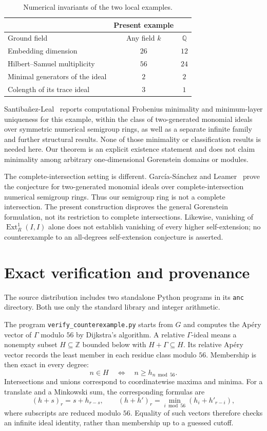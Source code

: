 \documentclass[11pt,letterpaper]{article}
\theoremstyle{remark}
\newcommand{\ZZ}{\mathbb Z}
\newcommand{\QQ}{\mathbb Q}
\newcommand{\Ext}{\operatorname{Ext}}
\numberwithin{equation}{section}
\begin{document}
\begin{table}[htbp]
\centering
\small
\begin{tabularx}{\textwidth}{@{}>{\raggedright\arraybackslash}Xcc@{}}
\toprule
 & Present example & \cite[Example~3.3]{CGI}\\
\midrule
Ground field & Any field $k$ & $\QQ$\\
Embedding dimension & $26$ & $12$\\
Hilbert--Samuel multiplicity & $56$ & $24$\\
Minimal generators of the ideal & $2$ & $2$\\
Colength of its trace ideal & $3$ & $1$\\
\bottomrule
\end{tabularx}
\caption{Numerical invariants of the two local examples.}\label{tab:comparison}
\end{table}


Santiba\~nez-Leal~\cite{FSL} reports computational Frobenius minimality and minimum-layer uniqueness for this example, within the class of two-generated monomial ideals over symmetric numerical semigroup rings, as well as a separate infinite family and further structural results. None of those minimality or classification results is needed here. Our theorem is an explicit existence statement and does not claim minimality among arbitrary one-dimensional Gorenstein domains or modules.

The complete-intersection setting is different. Garc\'ia-S\'anchez and Leamer~\cite{GL} prove the conjecture for two-generated monomial ideals over complete-intersection numerical semigroup rings. Thus our semigroup ring is not a complete intersection. The present construction disproves the general Gorenstein formulation, not its restriction to complete intersections. Likewise, vanishing of $\Ext_R^1(I,I)$ alone does not establish vanishing of every higher self-extension; no counterexample to an all-degrees self-extension conjecture is asserted.

\section{Exact verification and provenance}\label{sec:verification}
The source distribution includes two standalone Python programs in its \texttt{anc} directory. Both use only the standard library and integer arithmetic.

\pagebreak
The program \texttt{verify\_counterexample.py} starts from $G$ and computes the Ap\'ery vector of $\Gamma$ modulo $56$ by Dijkstra's algorithm. A relative $\Gamma$-ideal means a nonempty subset $H\subseteq\ZZ$ bounded below with $H+\Gamma\subseteq H$. Its relative Ap\'ery vector records the least member in each residue class modulo $56$. Membership is then exact in every degree:
\[
 n\in H\quad\Longleftrightarrow\quad n\geq h_{n\bmod56}.
\]
Intersections and unions correspond to coordinatewise maxima and minima. For a translate and a Minkowski sum, the corresponding formulas are
\[
 (h+s)_r=s+h_{r-s},\qquad
 (h\mathbin{+}h')_r=\min_{i\bmod56}(h_i+h'_{r-i}),
\]
where subscripts are reduced modulo $56$. Equality of such vectors therefore checks an infinite ideal identity, rather than membership up to a guessed cutoff.
\end{document}

